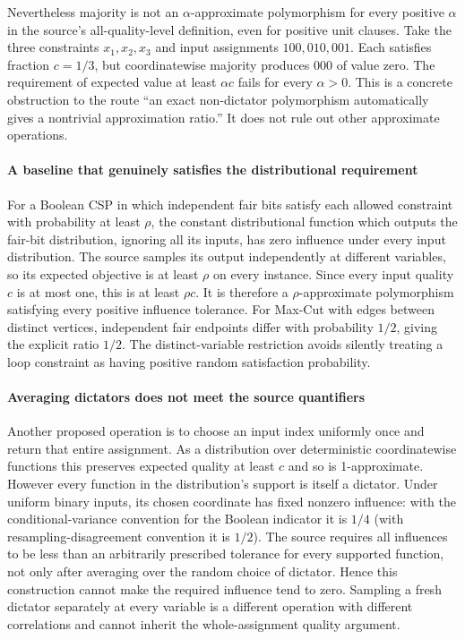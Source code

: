 \documentclass[11pt]{article}
\begin{document}
Nevertheless majority is not an $\alpha$-approximate polymorphism for every positive $\alpha$ in the source's all-quality-level definition, even for positive unit clauses. Take the three constraints $x_1,x_2,x_3$ and input assignments $100,010,001$. Each satisfies fraction $c=1/3$, but coordinatewise majority produces $000$ of value zero. The requirement of expected value at least $\alpha c$ fails for every $\alpha>0$. This is a concrete obstruction to the route ``an exact non-dictator polymorphism automatically gives a nontrivial approximation ratio.'' It does not rule out other approximate operations.

\paragraph{A baseline that genuinely satisfies the distributional requirement}
For a Boolean CSP in which independent fair bits satisfy each allowed constraint with probability at least $\rho$, the constant distributional function which outputs the fair-bit distribution, ignoring all its inputs, has zero influence under every input distribution. The source samples its output independently at different variables, so its expected objective is at least $\rho$ on every instance. Since every input quality $c$ is at most one, this is at least $\rho c$. It is therefore a $\rho$-approximate polymorphism satisfying every positive influence tolerance. For Max-Cut with edges between distinct vertices, independent fair endpoints differ with probability $1/2$, giving the explicit ratio $1/2$. The distinct-variable restriction avoids silently treating a loop constraint as having positive random satisfaction probability.

\paragraph{Averaging dictators does not meet the source quantifiers}
Another proposed operation is to choose an input index uniformly once and return that entire assignment. As a distribution over deterministic coordinatewise functions this preserves expected quality at least $c$ and so is 1-approximate. However every function in the distribution's support is itself a dictator. Under uniform binary inputs, its chosen coordinate has fixed nonzero influence: with the conditional-variance convention for the Boolean indicator it is $1/4$ (with resampling-disagreement convention it is $1/2$). The source requires all influences to be less than an arbitrarily prescribed tolerance for every supported function, not only after averaging over the random choice of dictator. Hence this construction cannot make the required influence tend to zero. Sampling a fresh dictator separately at every variable is a different operation with different correlations and cannot inherit the whole-assignment quality argument.
\end{document}
